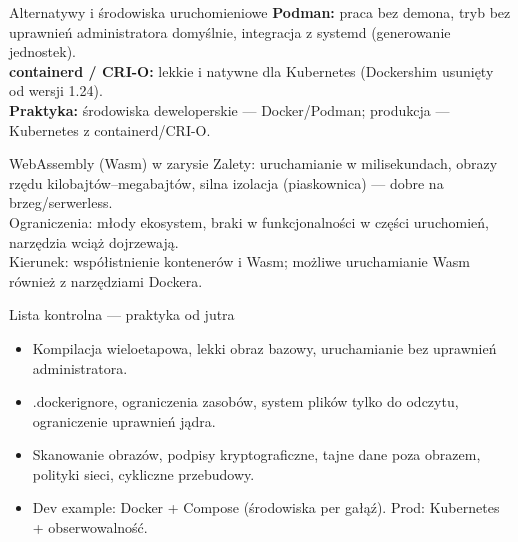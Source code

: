 \documentclass[10pt, aspectratio=169]{beamer}
\begin{document}
\begin{frame}{Alternatywy i środowiska uruchomieniowe}
\textbf{Podman:} praca bez demona, tryb bez uprawnień administratora domyślnie, integracja z systemd (generowanie jednostek). \\
\textbf{containerd / CRI-O:} lekkie i natywne dla Kubernetes (Dockershim usunięty od wersji 1.24). \\
\textbf{Praktyka:} środowiska deweloperskie — Docker/Podman; produkcja — Kubernetes z containerd/CRI-O.
\end{frame}

\begin{frame}{WebAssembly (Wasm) w zarysie}
Zalety: uruchamianie w milisekundach, obrazy rzędu kilobajtów–megabajtów, silna izolacja (piaskownica) — dobre na brzeg/serwerless. \\
Ograniczenia: młody ekosystem, braki w funkcjonalności w części uruchomień, narzędzia wciąż dojrzewają. \\
Kierunek: współistnienie kontenerów i Wasm; możliwe uruchamianie Wasm również z narzędziami Dockera.
\end{frame}

\begin{frame}{Lista kontrolna — praktyka od jutra}
\begin{itemize}
  \item Kompilacja wieloetapowa, lekki obraz bazowy, uruchamianie bez uprawnień administratora.
  \item .dockerignore, ograniczenia zasobów, system plików tylko do odczytu, ograniczenie uprawnień jądra.
  \item Skanowanie obrazów, podpisy kryptograficzne, tajne dane poza obrazem, polityki sieci, cykliczne przebudowy.
  \item Dev example: Docker + Compose (środowiska per gałąź). Prod: Kubernetes + obserwowalność.
\end{itemize}
\end{frame}
\end{document}
